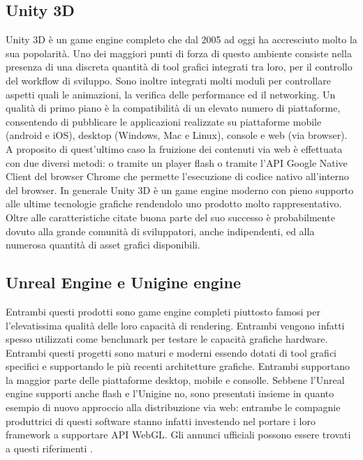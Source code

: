 \subsection{Unity 3D}
Unity 3D \`e un game engine completo che dal 2005 ad oggi ha accresciuto molto la sua popolarit\`a. Uno dei maggiori punti di forza di questo ambiente consiste nella presenza di una discreta quantit\`a di tool grafici integrati tra loro, per il controllo del workflow di sviluppo. Sono inoltre integrati molti moduli per controllare aspetti quali le animazioni, la verifica delle performance ed il networking.
Un qualit\`a di primo piano \`e la compatibilit\`a di un elevato numero di piattaforme, consentendo di pubblicare le applicazioni realizzate su piattaforme mobile (android e iOS), desktop (Windows, Mac e Linux), console e web (via browser).
A proposito di quest'ultimo caso la fruizione dei contenuti via web \`e effettuata con due diversi metodi: o tramite un player flash o tramite l'\ac{API} Google Native Client del browser Chrome che permette l'esecuzione di codice nativo all'interno del browser.
In generale Unity 3D \`e un game engine moderno con pieno supporto alle ultime tecnologie grafiche rendendolo uno prodotto molto rappresentativo.
Oltre alle caratteristiche citate buona parte del suo successo \`e probabilmente dovuto alla grande comunit\`a di sviluppatori, anche indipendenti, ed alla numerosa quantit\`a di asset grafici disponibili.

\subsection{Unreal Engine e Unigine engine}
Entrambi questi prodotti sono game engine completi piuttosto famosi per l'elevatissima qualit\`a delle loro capacit\`a di rendering. Entrambi vengono infatti spesso utilizzati come benchmark per testare le capacit\`a grafiche hardware. Entrambi questi progetti sono maturi e moderni essendo dotati di tool grafici specifici e supportando le pi\`u recenti architetture grafiche. Entrambi supportano la maggior parte delle piattaforme desktop, mobile e consolle. Sebbene l'Unreal engine supporti anche flash e l'Unigine no, sono presentati insieme in quanto esempio di nuovo approccio alla distribuzione via web: entrambe le compagnie produttrici di questi software stanno infatti investendo nel portare i loro framework a supportare \ac{API} WebGL. Gli annunci ufficiali possono essere trovati a questi riferimenti \cite{site:mozillaunrealannounce,site:unigineannounce}.

